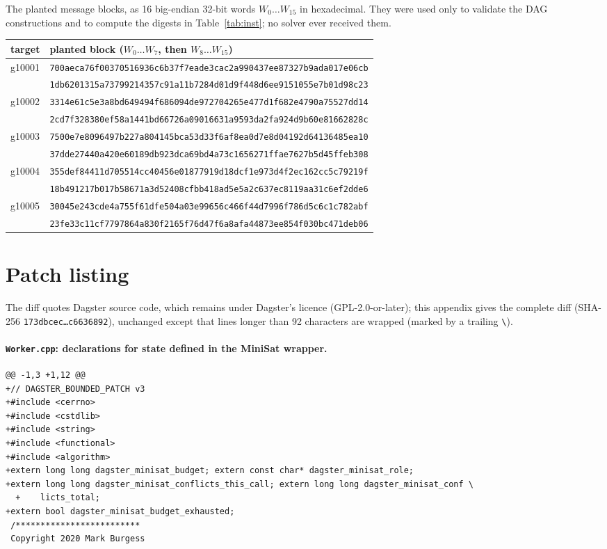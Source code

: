 \documentclass[11pt,a4paper]{article}
\begin{document}
The planted message blocks, as 16 big-endian 32-bit words $W_0\dots W_{15}$ in hexadecimal. They were
used only to validate the DAG constructions and to compute the digests in Table~\ref{tab:inst}; no
solver ever received them.
{\scriptsize\setlength{\tabcolsep}{3pt}
\begin{longtable}{@{}ll@{}}
\toprule
\textbf{target} & \textbf{planted block ($W_0\dots W_7$, then $W_8\dots W_{15}$)}\\
\midrule\endhead
g10001 & \texttt{700aeca76f00370516936c6b37f7eade3cac2a990437ee87327b9ada017e06cb}\\ & \texttt{1db6201315a73799214357c91a11b7284d01d9f448d6ee9151055e7b01d98c23}\\
g10002 & \texttt{3314e61c5e3a8bd649494f686094de972704265e477d1f682e4790a75527dd14}\\ & \texttt{2cd7f328380ef58a1441bd66726a09016631a9593da2fa924d9b60e81662828c}\\
g10003 & \texttt{7500e7e8096497b227a804145bca53d33f6af8ea0d7e8d04192d64136485ea10}\\ & \texttt{37dde27440a420e60189db923dca69bd4a73c1656271ffae7627b5d45ffeb308}\\
g10004 & \texttt{355def84411d705514cc40456e01877919d18dcf1e973d4f2ec162cc5c79219f}\\ & \texttt{18b491217b017b58671a3d52408cfbb418ad5e5a2c637ec8119aa31c6ef2dde6}\\
g10005 & \texttt{30045e243cde4a755f61dfe504a03e99656c466f44d7996f786d5c6c1c782abf}\\ & \texttt{23fe33c11cf7797864a830f2165f76d47f6a8afa44873ee854f030bc471deb06}\\
\bottomrule
\end{longtable}}

\section{Patch listing}\label{app:patch}

The diff quotes Dagster source code, which remains under Dagster's licence (GPL-2.0-or-later);
this appendix gives the complete diff (SHA-256 \texttt{173dbcec\dots c6636892}), unchanged except that lines longer than 92 characters are
wrapped (marked by a trailing \texttt{\textbackslash}).

\paragraph{\texttt{Worker.cpp}: declarations for state defined in the MiniSat wrapper.}
{\scriptsize\begin{verbatim}
@@ -1,3 +1,12 @@
+// DAGSTER_BOUNDED_PATCH v3
+#include <cerrno>
+#include <cstdlib>
+#include <string>
+#include <functional>
+#include <algorithm>
+extern long long dagster_minisat_budget; extern const char* dagster_minisat_role;
+extern long long dagster_minisat_conflicts_this_call; extern long long dagster_minisat_conf \
  +    licts_total;
+extern bool dagster_minisat_budget_exhausted;
 /*************************
 Copyright 2020 Mark Burgess
\end{verbatim}}
\end{document}
